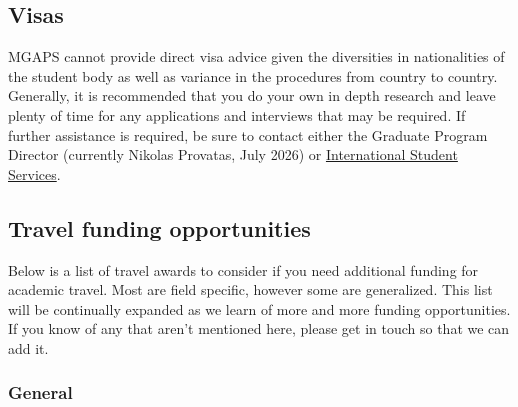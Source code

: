     \subsection{Visas} 
    MGAPS cannot provide direct visa advice given the diversities in nationalities of the student body as well as variance in the procedures from country to country. Generally, it is recommended that you do your own in depth research and leave plenty of time for any applications and interviews that may be required. If further assistance is required, be sure to contact either the Graduate Program Director (currently Nikolas Provatas, July 2026) or \href{https://www.mcgill.ca/internationalstudents/ihi-contact-us}{International Student Services}.


    \subsection{Travel funding opportunities} 
    Below is a list of travel awards to consider if you need additional funding for academic travel. Most are field specific, however some are generalized. This list will be continually expanded as we learn of more and more funding opportunities. If you know of any that aren't mentioned here, please get in touch so that we can add it.

   \subsubsection{General}

